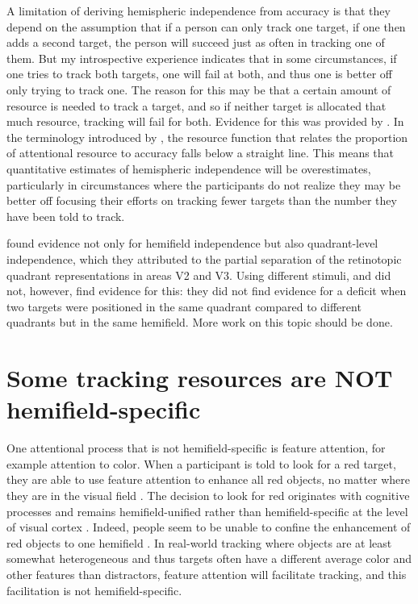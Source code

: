 \documentclass[
]{book}
\begin{document}
A limitation of deriving hemispheric independence from accuracy is that they depend on the assumption that if a person can only track one target, if one then adds a second target, the person will succeed just as often in tracking one of them. But my introspective experience indicates that in some circumstances, if one tries to track both targets, one will fail at both, and thus one is better off only trying to track one. The reason for this may be that a certain amount of resource is needed to track a target, and so if neither target is allocated that much resource, tracking will fail for both. Evidence for this was provided by \citet{chenResourceDemandsObject2013}. In the terminology introduced by \citet{normanDatalimitedResourcelimitedProcesses1975}, the resource function that relates the proportion of attentional resource to accuracy falls below a straight line. This means that quantitative estimates of hemispheric independence will be overestimates, particularly in circumstances where the participants do not realize they may be better off focusing their efforts on tracking fewer targets than the number they have been told to track.

\citet{carlsonQuadranticDeficitReveals2007} found evidence not only for hemifield independence but also quadrant-level independence, which they attributed to the partial separation of the retinotopic quadrant representations in areas V2 and V3. Using different stimuli, \citet{shimSpatialSeparationTargets2008} and \citet{holcombeObjectTrackingAbsence2014} did not, however, find evidence for this: they did not find evidence for a deficit when two targets were positioned in the same quadrant compared to different quadrants but in the same hemifield. More work on this topic should be done.

\hypertarget{some-tracking-resources-are-not-hemifield-specific}{%
\section{Some tracking resources are NOT hemifield-specific}\label{some-tracking-resources-are-not-hemifield-specific}}

One attentional process that is not hemifield-specific is feature attention, for example attention to color. When a participant is told to look for a red target, they are able to use feature attention to enhance all red objects, no matter where they are in the visual field \citep{whiteFeaturebasedAttentionInvoluntarily2011}. The decision to look for red originates with cognitive processes and remains hemifield-unified rather than hemifield-specific at the level of visual cortex \citep{saenzGlobalEffectsFeaturebased2002}. Indeed, people seem to be unable to confine the enhancement of red objects to one hemifield \citep{loHowWeSelect2014}. In real-world tracking where objects are at least somewhat heterogeneous and thus targets often have a different average color and other features than distractors, feature attention will facilitate tracking, and this facilitation is not hemifield-specific.
\end{document}
